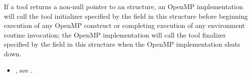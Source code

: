 \effect
If a tool returns a non-null pointer to an
 structure,
an OpenMP implementation will call the tool initializer specified by the
 field in this structure before
beginning execution of any OpenMP construct
or completing execution of any environment routine invocation; the
OpenMP implementation will call the tool finalizer specified by the
 field in this structure when the OpenMP
implementation shuts down.



\crossreferences
\begin{itemize}
    \item {}, see
     .
\end{itemize}

